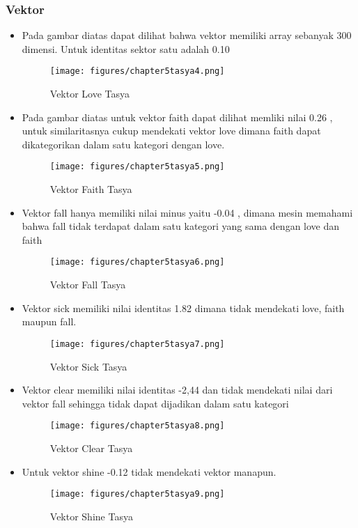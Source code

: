 \subsubsection{Vektor}
\begin{itemize}
\item Pada gambar diatas dapat dilihat bahwa vektor memiliki array sebanyak 300 dimensi. Untuk identitas sektor satu adalah 0.10
\begin{figure}[ht]
\centering
\texttt{[image: figures/chapter5tasya4.png]}
\caption{Vektor Love Tasya}
\label{Praktek}
\end{figure}


\item Pada gambar diatas untuk vektor faith dapat dilihat memliki nilai 0.26 , untuk similaritasnya cukup mendekati vektor love dimana faith dapat dikategorikan dalam satu kategori dengan love.
\begin{figure}[ht]
\centering
\texttt{[image: figures/chapter5tasya5.png]}
\caption{Vektor Faith Tasya}
\label{Praktek}
\end{figure}


\item Vektor fall hanya memiliki nilai minus yaitu -0.04 , dimana mesin memahami bahwa fall tidak terdapat dalam satu kategori yang sama dengan love dan faith
\begin{figure}[ht]
\centering
\texttt{[image: figures/chapter5tasya6.png]}
\caption{Vektor Fall Tasya}
\label{Praktek}
\end{figure}


\item  Vektor sick memiliki nilai identitas 1.82 dimana tidak mendekati love, faith maupun fall.
\begin{figure}[ht]
\centering
\texttt{[image: figures/chapter5tasya7.png]}
\caption{Vektor Sick Tasya}
\label{Praktek}
\end{figure}


\item Vektor clear memiliki nilai identitas -2,44 dan tidak mendekati nilai dari vektor fall sehingga tidak dapat dijadikan dalam satu kategori
\begin{figure}[ht]
\centering
\texttt{[image: figures/chapter5tasya8.png]}
\caption{Vektor Clear Tasya}
\label{Praktek}
\end{figure}

\item Untuk vektor shine -0.12 tidak mendekati vektor manapun.
\begin{figure}[ht]
\centering
\texttt{[image: figures/chapter5tasya9.png]}
\caption{Vektor Shine Tasya}
\label{Praktek}
\end{figure}



\end{itemize}
